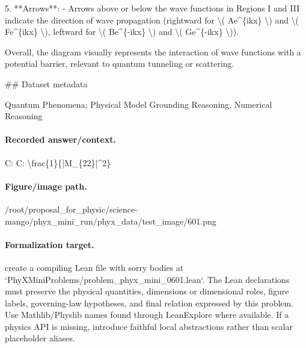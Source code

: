 5. **Arrows**:
   - Arrows above or below the wave functions in Regions I and III indicate the direction of wave propagation (rightward for \textbackslash{}( Ae\textasciicircum{}\{ikx\} \textbackslash{}) and \textbackslash{}( Fe\textasciicircum{}\{ikx\} \textbackslash{}), leftward for \textbackslash{}( Be\textasciicircum{}\{-ikx\} \textbackslash{}) and \textbackslash{}( Ge\textasciicircum{}\{-ikx\} \textbackslash{})).

Overall, the diagram visually represents the interaction of wave functions with a potential barrier, relevant to quantum tunneling or scattering.

\#\# Dataset metadata

Quantum Phenomena; Physical Model Grounding Reasoning, Numerical Reasoning

\paragraph{Recorded answer/context.}
C: C: \textbackslash{}frac\{1\}\{|M\_\{22\}|\textasciicircum{}2\}

\paragraph{Figure/image path.}
/root/proposal\_for\_physic/science-mango/phyx\_mini\_run/phyx\_data/test\_image/601.png

\paragraph{Formalization target.}
create a compiling Lean file with sorry bodies at `PhyXMiniProblems/problem\_phyx\_mini\_0601.lean`. The Lean declarations must preserve the physical quantities, dimensions or dimensional roles, figure labels, governing-law hypotheses, and final relation expressed by this problem.
Use Mathlib/Physlib names found through LeanExplore where available. If a physics API is missing, introduce faithful local abstractions rather than scalar placeholder aliases.


